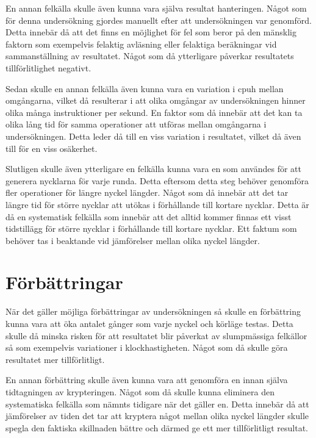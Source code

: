 En annan felkälla skulle även kunna vara själva resultat hanteringen. Något som för denna undersökning gjordes manuellt efter att undersökningen var genomförd. Detta innebär då att
det finns en möjlighet för fel som beror på den mänsklig faktorn som exempelvis felaktig avläsning eller felaktiga beräkningar vid sammanställning av resultatet. Något som då ytterligare
påverkar resultatets tillförlitlighet negativt. %

Sedan skulle en annan felkälla även kunna vara en variation i \gls{cpuh} mellan omgångarna, vilket då resulterar i att olika omgångar av undersökningen hinner olika många instruktioner
per sekund. En faktor som då innebär att det kan ta olika lång tid för samma operationer att utföras mellan omgångarna i undersökningen. Detta leder då till en viss variation i resultatet,
vilket då även till för en viss osäkerhet. %

Slutligen skulle även ytterligare en felkälla kunna vara en som användes för att generera nycklarna för varje runda. Detta eftersom detta steg behöver genomföra fler operationer för längre nyckel längder.
Något som då innebär att det tar längre tid för större nycklar att utökas i förhållande till kortare nycklar. Detta är då en systematisk felkälla som innebär att det alltid kommer
finnas ett visst tidstillägg för större nycklar i förhållande till kortare nycklar. Ett faktum som behöver tas i beaktande vid jämförelser mellan olika nyckel längder. %

\section{Förbättringar} %
\label{sec:improvements}
När det gäller möjliga förbättringar av undersökningen så skulle en förbättring kunna vara att öka antalet gånger som varje nyckel och körläge testas. Detta skulle då
minska risken för att resultatet blir påverkat av slumpmässiga felkällor så som exempelvis variationer i klockhastigheten. Något som då skulle göra resultatet mer tillförlitligt. %

En annan förbättring skulle även kunna vara att genomföra en innan själva tidtagningen av krypteringen. Något som då skulle kunna eliminera den systematiska
felkälla som nämnts tidigare när det gäller en. Detta innebär då att jämförelser av tiden det tar att kryptera något mellan olika nyckel längder skulle spegla
den faktiska skillnaden bättre och därmed ge ett mer tillförlitligt resultat. %

